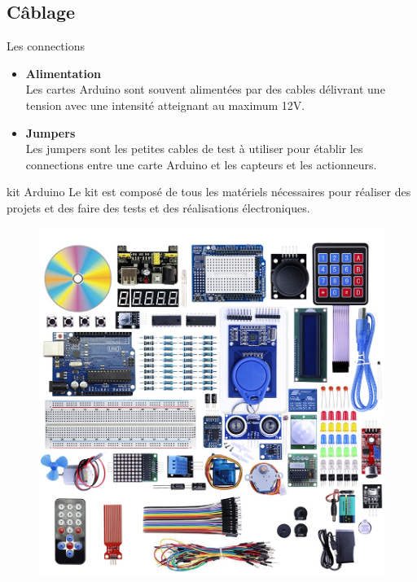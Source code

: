 \documentclass[]{beamer}
\begin{document}
	\subsection{Câblage}
	\begin{frame}
	{Les connections}
	\begin{itemize}
		\item \textbf{Alimentation} \\
		Les cartes Arduino sont souvent alimentées par des cables délivrant une tension avec une intensité atteignant au maximum 12V.
		\item \textbf{Jumpers} \\
		Les jumpers sont les petites cables de test à utiliser pour établir les connections entre une carte Arduino et les capteurs et les actionneurs.
	\end{itemize}
	\end{frame}
	\begin{frame}
	{kit Arduino}
	 Le kit est composé de tous les matériels nécessaires pour réaliser des projets et des faire des tests et des réalisations électroniques.
	 \begin{figure}
	 	\begin{center}
	 		\includegraphics[scale=0.25]{modules_for_arduino.jpg}
	 	\end{center}
	 \end{figure}
	\end{frame}
\end{document}
